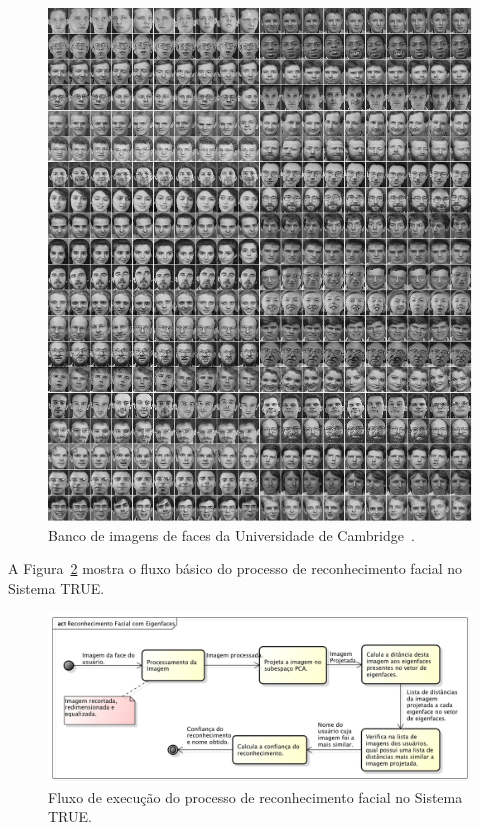 		\begin{figure}[htb]
			\begin{center}
				\includegraphics[scale=0.4]{figuras/4.ProblemaEProposta/cambrigdefacedb.png}
			\end{center}
			\caption{Banco de imagens de faces da Universidade de Cambridge~\cite{cambridgeFaceDb}.}
			\label{fig:cambridgeFaceDb}
		\end{figure}

		A Figura~\ref{fig:diagrama-reconhecimento} mostra o fluxo básico do processo de reconhecimento facial no Sistema TRUE.

			\begin{figure}[htb]
			\begin{center}
				\includegraphics[scale=0.5]{figuras/4.ProblemaEProposta/diagrama-reconhecimento2.png}
			\end{center}
			\caption{Fluxo de execução do processo de reconhecimento facial no Sistema TRUE.}
			\label{fig:diagrama-reconhecimento}
		\end{figure}

